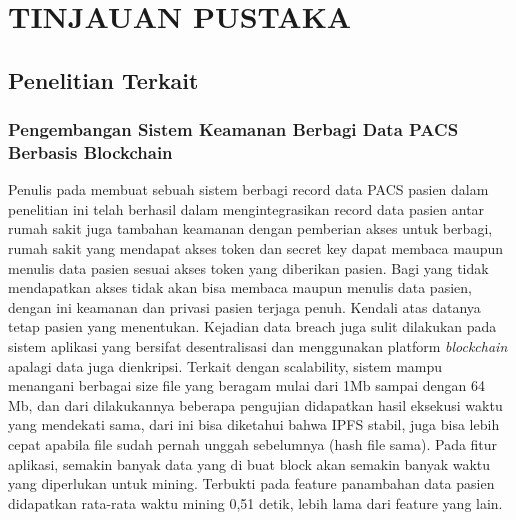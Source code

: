 \chapter{TINJAUAN PUSTAKA}


\section{Penelitian Terkait}

\subsection{Pengembangan Sistem Keamanan Berbagi Data PACS Berbasis Blockchain}
Penulis pada \parencite{DitoPrabowo2020} membuat sebuah sistem berbagi record data PACS pasien dalam penelitian ini
telah berhasil dalam mengintegrasikan record data pasien antar rumah sakit juga tambahan keamanan dengan pemberian akses untuk
berbagi, rumah sakit yang mendapat akses token dan secret key dapat membaca maupun menulis data pasien sesuai akses token yang
diberikan pasien. Bagi yang tidak mendapatkan akses tidak akan
bisa membaca maupun menulis data pasien, dengan ini keamanan
dan privasi pasien terjaga penuh. Kendali atas datanya tetap pasien yang menentukan. Kejadian data breach juga sulit dilakukan
pada sistem aplikasi yang bersifat desentralisasi dan menggunakan
platform \emph{blockchain} apalagi data juga dienkripsi.
Terkait dengan scalability, sistem mampu menangani berbagai size file yang beragam mulai dari 1Mb sampai dengan 64 Mb,
dan dari dilakukannya beberapa pengujian didapatkan hasil eksekusi waktu yang mendekati sama, dari ini bisa diketahui bahwa IPFS
stabil, juga bisa lebih cepat apabila file sudah pernah unggah sebelumnya (hash file sama).
Pada fitur aplikasi, semakin banyak data yang di buat block
akan semakin banyak waktu yang diperlukan untuk mining. Terbukti pada feature panambahan data pasien didapatkan rata-rata
waktu mining 0,51 detik, lebih lama dari feature yang lain.

